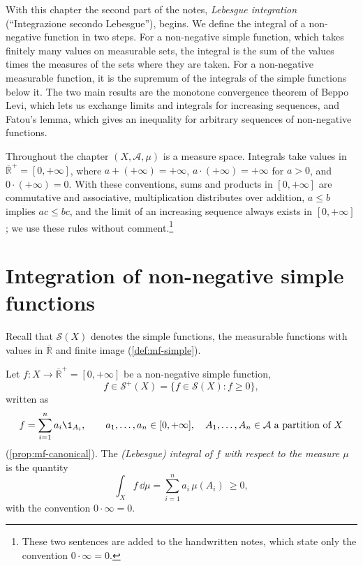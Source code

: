 
With this chapter the second part of the notes, \emph{Lebesgue integration} (``Integrazione
secondo Lebesgue''), begins. We define the integral of a non-negative function in two steps.
For a non-negative simple function, which takes finitely many values on measurable sets, the
integral is the sum of the values times the measures of the sets where they are taken. For a
non-negative measurable function, it is the supremum of the integrals of the simple functions
below it. The two main results are the monotone convergence theorem of Beppo Levi, which lets
us exchange limits and integrals for increasing sequences, and Fatou's lemma, which gives an
inequality for arbitrary sequences of non-negative functions.

Throughout the chapter $(X,\mathcal A,\mu)$ is a measure space. Integrals take values in
$\overline{\mathbb R}^+=[0,+\infty]$, where $a+(+\infty)=+\infty$, $a\cdot(+\infty)=+\infty$ for
$a>0$, and $0\cdot(+\infty)=0$. With these conventions, sums and products in $[0,+\infty]$ are
commutative and associative, multiplication distributes over addition, $a\le b$ implies
$ac\le bc$, and the limit of an increasing sequence always exists in $[0,+\infty]$; we use these
rules without comment.\footnote{These two sentences are added to the handwritten notes, which
state only the convention $0\cdot\infty=0$.}

\section{Integration of non-negative simple functions}\label{sec:in-simple}

Recall that $\mathcal S(X)$ denotes the simple functions, the measurable functions with values
in $\overline{\mathbb R}$ and finite image (\cref{def:mf-simple}).

\begin{definition}\label{def:in-simple-integral}
Let $f:X\to\overline{\mathbb R}^+=[0,+\infty]$ be a non-negative simple function,
\[
  f\in\mathcal S^+(X)=\{f\in\mathcal S(X):f\ge0\},
\]
written as
\[
  f=\sum_{i=1}^na_i\1_{A_i},\qquad a_1,\dots,a_n\in[0,+\infty],\quad A_1,\dots,A_n\in\mathcal A\text{ a partition of }X
\]
(\cref{prop:mf-canonical}). The \emph{(Lebesgue) integral of $f$ with respect to the measure
$\mu$} is the quantity
\[
  \int_Xf\,\dd\mu=\sum_{i=1}^na_i\,\mu(A_i)\ \ge0,
\]
with the convention $0\cdot\infty=0$.
\end{definition}

